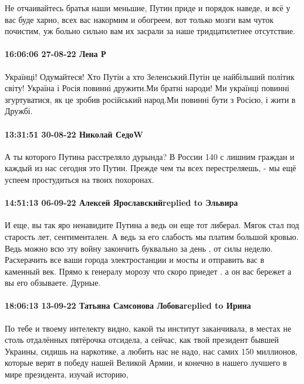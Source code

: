 Не отчаивайтесь братья наши меньшие, Путин приде и порядок наведе, и всё у вас
буде харно, всех вас накормим и обогреем, вот только мозги вам чуток почистим,
уж больно сильно вам их засрали за наше тридцатилетнее отсутствие.

\paragraph{16:06:06 27-08-22 Лена Р}

Українці! Одумайтеся! Хто Путін а хто Зеленський.Путін це найбільший політик
світу! Україна і Росія повинні дружити.Ми братні народи! Ми українці повинні
згуртуватися, як це зробив російський народ.Ми повинні бути з Росією, і жити в
Дружбі.

\paragraph{13:31:51 30-08-22 Николай СедоW}

А ты которого Путина расстреляло дурында? В России 140 с лишним граждан и каждый из нас сегодня это Путин. Прежде чем ты всех перестреляешь, - мы ещё успеем простудиться на твоих похоронах.

\paragraph{14:51:13 06-09-22 Алексей Ярославскийreplied to Эльвира}

И еще, вы так яро ненавидите Путина а ведь он еще тот либерал. Мягок стал под
старость лет, сентиментален. А ведь за его слабость мы платим большой кровью.
Ведь можно всю эту войну закончить буквально за день , от силы неделю.
Расхерачить все ваши города электростанции и мосты и отправить вас в каменный
век. Прямо к генералу морозу что скоро приедет . а он вас бережет а вы его
обзываете. Дурные.

\paragraph{18:06:13 13-09-22 Татьяна Самсонова Лобоваreplied to Ирина}

По тебе и твоему интелекту видно, какой ты институт заканчивала, в местах не
столь отдалённых пятёрочка отсидела, а сейчас, как твой президент бывшей
Украины, сидишь на наркотике, а любить нас не надо, нас самих 150 миллионов,
которые верят в победу нашей Великой Армии, и конечно в нашего лучшего в мире
президента, изучай историю,

